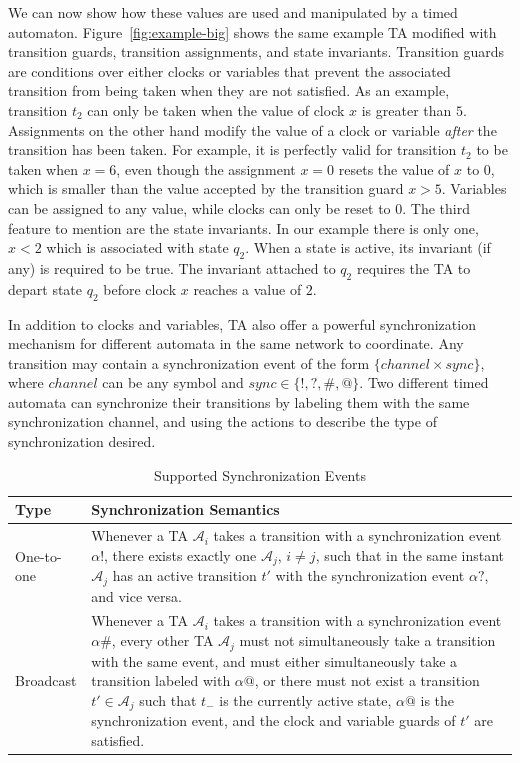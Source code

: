 \documentclass[a4paper,11pt]{report}
\theoremstyle{definition}
\begin{document}
We can now show how these values are used and manipulated by a timed automaton.
Figure~\ref{fig:example-big} shows the same example TA modified with transition
guards, transition assignments, and state invariants. Transition guards are
conditions over either clocks or variables that prevent the associated
transition from being taken when they are not satisfied. As an example,
transition $t_{2}$ can only be taken when the value of clock $x$ is greater than
$5$. Assignments on the other hand modify the value of a clock or variable
\emph{after} the transition has been taken. For example, it is perfectly valid
for transition $t_{2}$ to be taken when $x=6$, even though the assignment $x=0$
resets the value of $x$ to $0$, which is smaller than the value accepted by the
transition guard $x>5$. Variables can be assigned to any value, while clocks can
only be reset to $0$. The third feature to mention are the state invariants. In
our example there is only one, $x<2$ which is associated with state $q_{2}$.
When a state is active, its invariant (if any) is required to be true. The
invariant attached to $q_{2}$ requires the TA to depart state $q_{2}$ before
clock $x$ reaches a value of $2$.


In addition to clocks and variables, TA also offer a powerful synchronization
mechanism for different automata in the same network to coordinate. Any
transition may contain a synchronization event of the form
$\{channel \times sync\}$, where $channel$ can be any symbol and
$sync \in \{!,?,\#,@\}$. Two different timed automata can synchronize their
transitions by labeling them with the same synchronization channel, and using
the actions to describe the type of synchronization desired.

\begin{table}
  \centering
  \begin{tabular}{l p{}}
    \textbf{Type} & \textbf{Synchronization Semantics} \\
    \midrule
    One-to-one & Whenever a TA $\mathcal{A}_{i}$ takes a transition with a
                 synchronization event $\alpha{!}$, there exists exactly one
                 $\mathcal{A}_{j}$, $i\neq j$, such that in the same instant
                 $\mathcal{A}_{j}$ has an active transition $t'$ with the
                 synchronization event $\alpha{?}$, and vice versa. \\
    \midrule
    Broadcast &  Whenever a TA $\mathcal{A}_{i}$ takes a transition with a
                synchronization event $\alpha\#$, every other TA
                $\mathcal{A}_{j}$ must not simultaneously take a transition with
                the same event, and must either simultaneously take a transition
                labeled with $\alpha @$, or there must not exist a transition
                $t' \in \mathcal{A}_{j}$ such that $t_{-}$ is the currently
                active state, $\alpha @$ is the synchronization event, and the
                clock and variable guards of $t'$ are satisfied.
    \\
    \midrule
  \end{tabular}
  \caption{Supported Synchronization Events}
  \label{table:sync-def}
\end{table}
\end{document}
